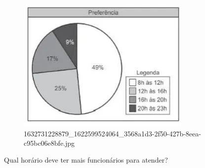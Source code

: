 \begin{escolha}
\begin{boxmedio}
\begin{boxmedio}
{\begin{boxpeq}
\begin{boxpeq}
{\begin{boxpeq}
\begin{boxmedio}
\begin{boxmedio}
\begin{boxpeq}
\begin{boxmedio}
\begin{boxpeq}
\begin{boxpeq}
\begin{boxpeq}
\begin{boxpeq}
\begin{boxmedio}
{\begin{boxmedio}
\begin{boxmedio}
\begin{boxpeq}
\begin{boxmedio}
\begin{boxpeq}
\begin{boxpeq}
\begin{boxpeq}
\begin{escolha}
{\begin{boxmedio}
\begin{boxpeq}
\begin{boxpeq}
\begin{boxpeq}
\begin{boxpeq}
\begin{boxpeq}
\begin{boxmedio}
\begin{boxpeq}
\begin{boxpeq}
\begin{boxpeq}
{\begin{boxpeq}
\begin{boxmedio}
\begin{boxpeq}
\begin{boxpeq}
\begin{boxpeq}
{\begin{boxpeq}
\begin{boxmedio}
{\begin{boxpeq}
\begin{boxpeq}
\begin{boxmedio}
\begin{boxmedio}
\begin{boxpeq}
\begin{boxpeq}
{\begin{boxpeq}
\begin{boxpeq}
\begin{boxpeq}
\begin{boxpeq}
\begin{boxpeq}
\begin{escolha}
\begin{escolha}
{\begin{boxmedio}
\begin{boxpeq}
\begin{q°}
\begin{boxmedio}
\begin{boxpeq}
\begin{boxpeq}
\begin{boxmedio}
\begin{boxmedio}
\begin{boxmedio}
\begin{figure}
\centering
\includegraphics[width=3.32598in,height=2.58268in]{./_SAEB_9_MAT/media/image214.jpg}
\caption{1632731228879\_1622599524064\_3568a1d3-2f50-427b-8eea-c95bc06e8bfe.jpg}
\end{figure}


Qual horário deve ter mais funcionários para atender?




\end{boxmedio}
\end{boxmedio}
\end{boxmedio}
\end{boxpeq}
\end{boxpeq}
\end{boxmedio}
\end{q°}
\end{boxpeq}
\end{boxmedio}}
\end{escolha}
\end{escolha}
\end{boxpeq}
\end{boxpeq}
\end{boxpeq}
\end{boxpeq}
\end{boxpeq}}
\end{boxpeq}
\end{boxpeq}
\end{boxmedio}
\end{boxmedio}
\end{boxpeq}
\end{boxpeq}}
\end{boxmedio}
\end{boxpeq}}
\end{boxpeq}
\end{boxpeq}
\end{boxpeq}
\end{boxmedio}
\end{boxpeq}}
\end{boxpeq}
\end{boxpeq}
\end{boxpeq}
\end{boxmedio}
\end{boxpeq}
\end{boxpeq}
\end{boxpeq}
\end{boxpeq}
\end{boxpeq}
\end{boxmedio}}
\end{escolha}
\end{boxpeq}
\end{boxpeq}
\end{boxpeq}
\end{boxmedio}
\end{boxpeq}
\end{boxmedio}
\end{boxmedio}}
\end{boxmedio}
\end{boxpeq}
\end{boxpeq}
\end{boxpeq}
\end{boxpeq}
\end{boxmedio}
\end{boxpeq}
\end{boxmedio}
\end{boxmedio}
\end{boxpeq}}
\end{boxpeq}
\end{boxpeq}}
\end{boxmedio}
\end{boxmedio}
\end{escolha}
